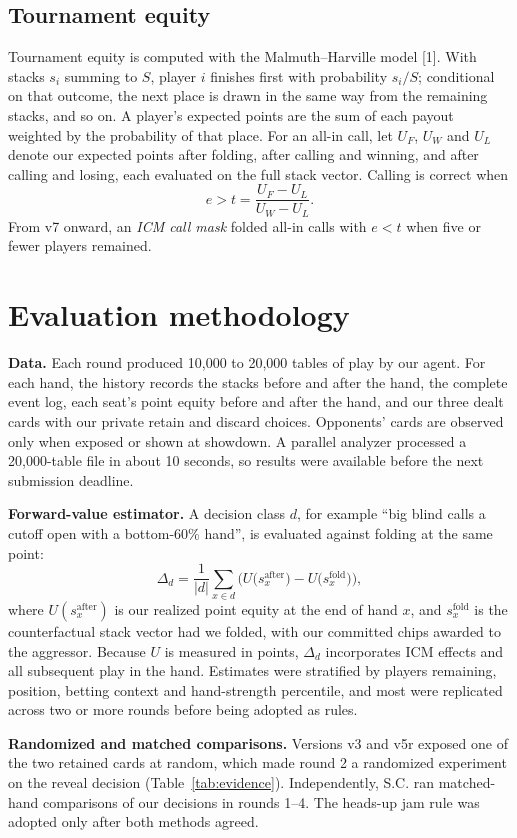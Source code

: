 \documentclass[10pt]{article}
\begin{document}
\subsection{Tournament equity}
Tournament equity is computed with the Malmuth--Harville model [1]. With stacks $s_i$ summing to $S$, player $i$ finishes first with probability $s_i/S$; conditional on that outcome, the next place is drawn in the same way from the remaining stacks, and so on. A player's expected points are the sum of each payout weighted by the probability of that place. For an all-in call, let $U_F$, $U_W$ and $U_L$ denote our expected points after folding, after calling and winning, and after calling and losing, each evaluated on the full stack vector. Calling is correct when
\[
e > t = \frac{U_F-U_L}{U_W-U_L}.
\]
From v7 onward, an \emph{ICM call mask} folded all-in calls with $e<t$ when five or fewer players remained.

\section{Evaluation methodology}

\textbf{Data.} Each round produced 10,000 to 20,000 tables of play by our agent. For each hand, the history records the stacks before and after the hand, the complete event log, each seat's point equity before and after the hand, and our three dealt cards with our private retain and discard choices. Opponents' cards are observed only when exposed or shown at showdown. A parallel analyzer processed a 20,000-table file in about 10 seconds, so results were available before the next submission deadline.

\textbf{Forward-value estimator.} A decision class $d$, for example ``big blind calls a cutoff open with a bottom-60\% hand'', is evaluated against folding at the same point:
\[
\Delta_d=\frac1{|d|}\sum_{x\in d}\Big(U\big(s^{\text{after}}_x\big)-U\big(s^{\text{fold}}_x\big)\Big),
\]
where $U(s^{\text{after}}_x)$ is our realized point equity at the end of hand $x$, and $s^{\text{fold}}_x$ is the counterfactual stack vector had we folded, with our committed chips awarded to the aggressor. Because $U$ is measured in points, $\Delta_d$ incorporates ICM effects and all subsequent play in the hand. Estimates were stratified by players remaining, position, betting context and hand-strength percentile, and most were replicated across two or more rounds before being adopted as rules.

\textbf{Randomized and matched comparisons.} Versions v3 and v5r exposed one of the two retained cards at random, which made round 2 a randomized experiment on the reveal decision (Table~\ref{tab:evidence}). Independently, S.C. ran matched-hand comparisons of our decisions in rounds 1--4. The heads-up jam rule was adopted only after both methods agreed.
\end{document}

